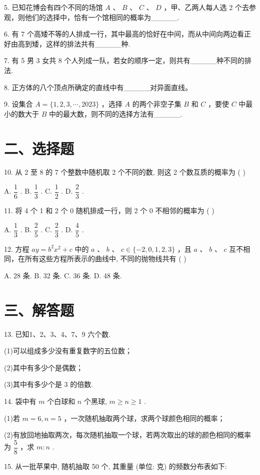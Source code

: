5. 已知花博会有四个不同的场馆 $A$ 、 $B$ 、 $C$ 、 $D$ ，甲、乙两人每人选 2 个去参观，则他们的选择中，恰有一个馆相同的概率为\_\_\_\_\_.

6. 有 7 个高矮不等的人排成一行，其中最高的恰好在中间，而从中间向两边看正好由高到矮，这样的排法共有\_\_\_\_\_种.

7. 有 5 男 3 女共 8 个人列成一队，若女的顺序一定，则共有\_\_\_\_\_种不同的排法.

8. 正方体的八个顶点所确定的直线中有\_\_\_\_\_对异面直线。

9. 设集合 $A = \{ 1,2,3,\cdots ,{2023}\}$ ，选择 $A$ 的两个非空子集 $B$ 和 $C$ ，要使 $C$ 中最小的数大于 $B$ 中的最大数，则不同的选择方法有\_\_\_\_\_.

\section*{二、选择题}

10. 从 2 至 8 的 7 个整数中随机取 2 个不同的数, 则这 2 个数互质的概率为 ( )

A. $\dfrac{1}{6}$ . B. $\dfrac{1}{3}$ . C. $\dfrac{1}{2}$ . D. $\dfrac{2}{3}$ .

11. 将 4 个 1 和 2 个 0 随机排成一行，则 2 个 0 不相邻的概率为 ( )

A. $\dfrac{1}{3}$ . B. $\dfrac{2}{5}$ . C. $\dfrac{2}{3}$ . D. $\dfrac{4}{5}$ .

12. 方程 ${ay} = {b}^{2}{x}^{2} + c$ 中的 $a$ 、 $b$ 、 $c \in  \{  - 2,0,1,2,3\}$ ，且 $a$ 、 $b$ 、 $c$ 互不相同，在所有这些方程所表示的曲线中, 不同的抛物线共有 ( )

A. 28 条. B. 32 条. C. 36 条. D. 48 条.

\section*{三、解答题}

13. 已知1、2、3、4、7、9 六个数.

(1)可以组成多少没有重复数字的五位数；

(2)其中有多少个是偶数；

(3)其中有多少个是 3 的倍数.

14. 袋中有 $m$ 个白球和 $n$ 个黑球, $m \geq  n \geq  1$ .

(1)若 $m = 6,n = 5$ ，一次随机抽取两个球，求两个球颜色相同的概率；

(2)有放回地抽取两次，每次随机抽取一个球，若两次取出的球的颜色相同的概率为 $\dfrac{5}{8}$ ，求 $m : n$ .

15. 从一批苹果中, 随机抽取 50 个, 其重量 (单位: 克) 的频数分布表如下:

